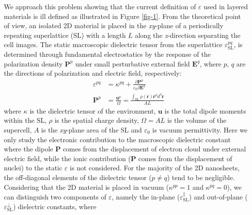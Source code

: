 \documentclass[journal=ancac3,manuscript=article,email=true,hyperref=true,keywords=false]{achemso}
\begin{document}
We approach this problem showing that the current definition of
$\varepsilon$ used in layered materials is ill defined as illustrated
in Figure \ref{fig-1}.  From the theoretical point of view, an
isolated 2D material is placed in the \textit{xy}-plane of a
periodically repeating superlattice (SL) with a length $L$ along the
\textit{z}-direction separating the cell images. The static macroscopic
dielectric tensor from the superlattice
$\varepsilon_{\mathrm{SL}}^{pq}$, is determined through fundamental
electrostatics by the response of the polarization density
$\boldsymbol{P}^{p}$ under small perturbative external field
$\boldsymbol{E}^{q}$, where $p$, $q$ are the directions of
polarization and electric field,
respectively\cite{Dressel_2001_electrodynamics}:
\begin{subequations}
  \begin{eqnarray}
      \label{eq:def-eps-1}
    &\varepsilon^{pq} &= \kappa^{pq} +
                                 {\displaystyle \frac{\partial \boldsymbol{P}^{p}}
                                 {\varepsilon_{0} \partial \boldsymbol{E}^{q}}} \\
          \label{eq:def-eps-2}
    &\boldsymbol{P}^{p} &=  {\displaystyle \frac{\boldsymbol{u}^{p}}{\Omega}}
                          = {\displaystyle \frac{{\displaystyle
          \int_{\mathrm{SL}} \rho(\boldsymbol{r}) \boldsymbol{r}^{p} d^{3}\boldsymbol{r}}}
                          {AL}}
  \end{eqnarray}
\end{subequations}
where $\kappa$ is the dielectric tensor of the environment,
$\boldsymbol{u}$ is the total dipole moments within the SL, $\rho$ is
the spatial charge density, $\Omega=AL$ is the volume of the
supercell, $A$ is the \textit{xy}-plane area of the SL and
$\varepsilon_{0}$ is vacuum permittivity. Here we only study the
electronic contribution to the macroscopic dielectric constant where
the dipole $\boldsymbol{P}$ comes from the displacement of electron
cloud under external electric field, while the ionic contribution
\cite{Laturia_2018} ($\boldsymbol{P}$ comes from the displacement of
nuclei) to the static $\varepsilon$ is not considered.
For the majority of the 2D nanosheets, the
off-diagonal elements of the dielectric tensor ($p \neq q$) tend to be
negligible.  Considering that the 2D material is placed in vacuum
($\kappa^{pp} = 1$ and $\kappa^{pq} = 0$), we can distinguish two
components of $\varepsilon$, namely the in-plane
($\varepsilon_{\mathrm{SL}}^{\parallel}$) and out-of-plane
($\varepsilon_{\mathrm{SL}}^{\perp}$) dielectric constants, where
\end{document}
